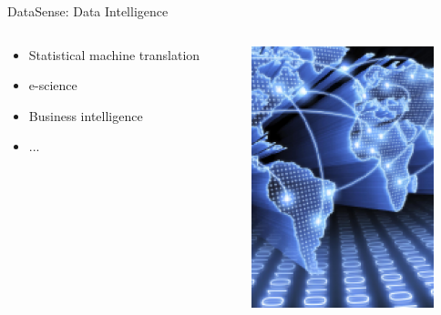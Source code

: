 \begin{frame}{DataSense: Data Intelligence}
\begin{columns}
\begin{column}{7cm}
\begin{itemize}
        \begin{itemize}
        \item Statistical machine translation
        \item e-science
        \item Business intelligence
        \item ...
        \end{itemize}
      \end{itemize}
    \end{column}
    \begin{column}{3cm}
      \includegraphics[width=\linewidth]{Images/digicosme.png}
    \end{column}
  \end{columns}
\end{frame}


